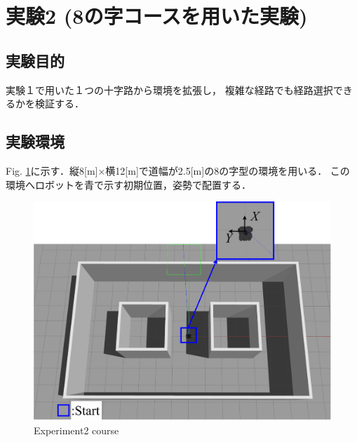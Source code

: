 \newpage
\section{実験2 (8の字コースを用いた実験)}
\subsection{実験目的}
実験１で用いた１つの十字路から環境を拡張し，
複雑な経路でも経路選択できるかを検証する．
\subsection{実験環境}
Fig. \ref{fig::hatinozi}に示す．縦8[m]×横12[m]で道幅が2.5[m]の8の字型の環境を用いる．
この環境へロボットを青で示す初期位置，姿勢で配置する．
\begin{figure}[H]
    \centering
    \includegraphics[width = 12cm]{./figs/coli.pdf}
    \caption{Experiment2 course}
    \label{fig::hatinozi}
\end{figure}

